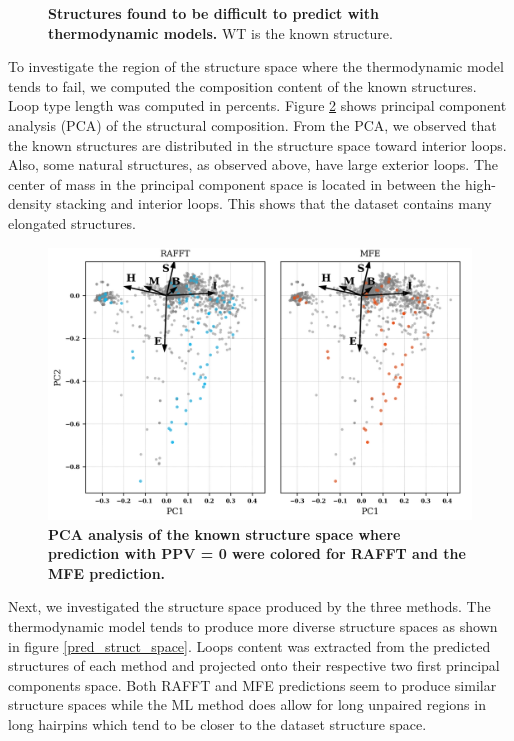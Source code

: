 \documentclass[a4paper,12pt]{article}
\begin{document}
{{\begin{figure}[!ht]
  \caption{\textbf{Structures found to be difficult to predict with thermodynamic models.}  WT is the known structure.\label{diff_struct}}
\end{figure}


To investigate the region of the structure space where the thermodynamic model
tends to fail, we computed the composition content of the known structures. Loop
type length was computed in percents. Figure \ref{pca_fails} shows principal
component analysis (PCA) of the structural composition. From the PCA, we
observed that the known structures are distributed in the structure space toward
interior loops. Also, some natural structures, as observed above, have large
exterior loops. The center of mass in the principal component space is located
in between the high-density stacking and interior loops. This shows that the
dataset contains many elongated structures.

\begin{figure}[htbp]
\centering
\includegraphics[scale=0.6]{img/pca_known.png}
\caption{\label{pca_fails}\textbf{PCA analysis of the known structure space where prediction with PPV = 0 were colored for RAFFT and the MFE prediction.}}
\end{figure}


Next, we investigated the structure space produced by the three methods. The
thermodynamic model tends to produce more diverse structure spaces as shown in
figure \ref{pred_struct_space}. Loops content was extracted from the predicted
structures of each method and projected onto their respective two first
principal components space. Both RAFFT and MFE predictions seem to produce
similar structure spaces while the ML method does allow for long unpaired
regions in long hairpins which tend to be closer to the dataset structure space.

}}
\end{document}
